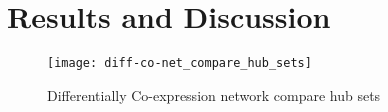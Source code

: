 \documentclass[
10pt, %
a4paper, %
oneside, %
headinclude,footinclude, %
BCOR5mm, %
]{scrartcl}
\begin{document}
\section{Results and Discussion}
\begin{figure}[!h]
\centering 
\texttt{[image: diff-co-net\_compare\_hub\_sets]} 
\caption[Differentially Co-expression network compare hub sets]{Differentially Co-expression network compare hub sets} %
\label{fig:7} 
\end{figure}



\newpage

\renewcommand{\refname}{\spacedlowsmallcaps{References}} %




\end{document}
